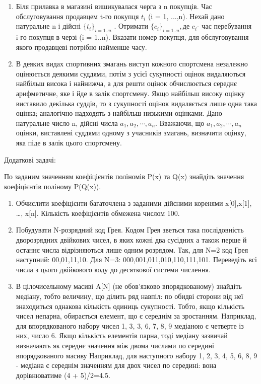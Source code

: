 \documentclass[]{article}
\makeatletter
\newcommand{\xslalph}[1]{\expandafter\@xslalph\csname c@#1\endcsname}
\newcommand{\@xslalph}[1]{%
    \ifcase#1\or а\or б\or в\or г\or д\or e\or є\or ж\or з\or i%
    \or й\or к\or л\or м\or н\or о\or п\or р\or с\or т%
    \or у\or ф\or х\or ц\or ч\or ш\or ю\or я\or аа\or бб\or вв%
    \else\@ctrerr\fi%
}
\makeatother
\begin{document}
\begin{enumerate}
\begin{enumerate}[label=\xslalph*)]
\begin{enumerate}
\begin{enumerate}[label=\xslalph*)]
\begin{enumerate}
\item
  Біля прилавка в магазині вишикувалася черга з n покупців. Час
  обслуговування продавцем t-го покупця \(t_{i}\) (i = 1, ...,n). Нехай
  дано натуральне n і дійсні \({\{ t_{i}\}}_{i = 1..n}\) . Отримати
  \({\{ c_{i}\}}_{i = 1..n},\)де \(c_{i}\)- час перебування i-го покупця
  в черзі (i = 1..n). Вказати номер покупця, для обслуговування якого
  продавцеві потрібно найменше часу.
\item
  В деяких видах спортивних змагань виступ кожного спортсмена незалежно
  оцінюється деякими суддями, потім з усієї сукупності оцінок
  видаляються найбільш висока і найнижча, а для решти оцінок
  обчислюється середнє арифметичне, яке і йде в залік спортсмену. Якщо
  найбільш високу оцінку виставило декілька суддів, то з сукупності
  оцінок видаляється лише одна така оцінка; аналогічно надходять з
  найбільш низькими оцінками. Дано натуральне число n, дійсні числа
  \(a_{1},a_{2},\cdots,a_{n}\). Вважаючи, що
  \(a_{1},a_{2},\cdots,a_{n}\)оцінки, виставлені суддями одному з
  учасників змагань, визначити оцінку, яка піде в залік цього
  спортсмену.
\end{enumerate}

Додаткові задачі:

По заданим значенням коефіцієнтів поліномів P(x) та Q(x) знайдіть
значення коефіцієнтів поліному P(Q(x)).

\begin{enumerate}
\def\labelenumi{\arabic{enumi})}
\setcounter{enumi}{12}
\item
  Обчислити коефіцієнти багаточлена з заданими дійсними коренями
  x{[}0{]},x{[}1{]}, \ldots{}, x{[}n{]}. Кількість коефіцієнтів обмежена
  числом 100.
\item
  Побудувати N-розрядний код Грея. Кодом Грея зветься така послідовність
  дворозрядних двійкових чисел, в яких кожні два сусідних а також перше
  й останнє числа відрізняються лише одним розрядом. Так, для N=2 код
  Грея наступний: 00,01,11,10. Для N=3: 000,001,011,010,110,111,101.
  Переведіть всі числа з цього двійкового коду до десяткової системи
  числення.
\item
  В цілочисельному масиві A{[}N{]} (не обов'язково впорядкованому)
  знайдіть медіану, тобто величину, що ділить ряд навпіл: по обидві
  сторони від неї знаходиться однакова кількість одиниць сукупності.
  Тобто, якщо кількість чисел непарна, обирається елемент, що є середнім
  за зростанням. Наприклад, для впорядкованого набору чисел 1, 3, 3, 6,
  7, 8, 9 медіаною є четверте із них, число 6. Якщо кількість елементів
  парна, тоді медіану зазвичай визначають як середнє значення між двома
  числами по середині впорядкованого масиву Наприклад, для наступного
  набору 1, 2, 3, 4, 5, 6, 8, 9 - медіана є середнім значенням для двох
  чисел по середині: вона дорівнюватиме (4 + 5)/2=4.5.
\end{enumerate}
\newpage

\end{enumerate}
\end{enumerate}
\end{enumerate}
\end{enumerate}
\end{document}
